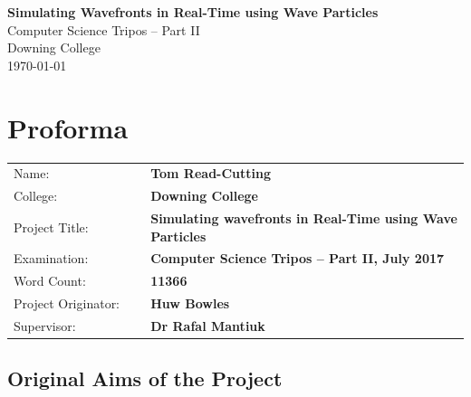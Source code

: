 \documentclass[12pt,a4paper,twoside]{report}
\begin{document}
\pagestyle{empty}


\vspace*{60mm}

\begin{center}

\Huge

\textbf{Simulating Wavefronts in Real-Time using Wave Particles} \\[5mm]

Computer Science Tripos -- Part II \\[5mm]

Downing College \\[5mm]

\today  %

\end{center}


\chapter*{Proforma}

{\large

\begin{tabular}{p{0.3\linewidth}p{0.7\linewidth}}

Name:               & \bf Tom Read-Cutting                       \\

College:            & \bf Downing College                    \\

Project Title:      & \bf  Simulating wavefronts in Real-Time using Wave
Particles \\

Examination:        & \bf Computer Science Tripos -- Part II, July 2017  \\

Word Count:         & \bf 11366 \\

Project Originator: & \bf Huw Bowles                  \\

Supervisor:         & \bf Dr Rafal Mantiuk                    \\

\end{tabular}

}

\section*{Original Aims of the Project}
\end{document}
